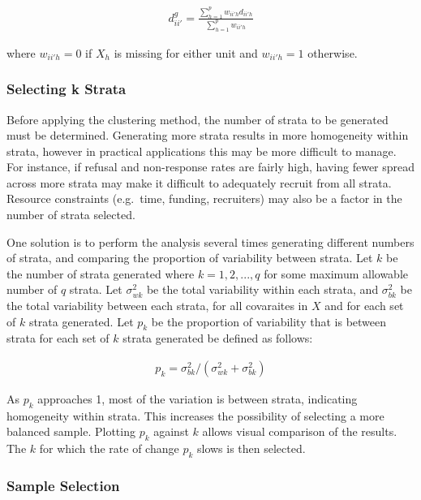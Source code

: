 \documentclass[man]{apa6}
\begin{document}
\begin{align}
  d^{g}_{ii'} = \frac{\sum^p_{h = 1}w_{ii'h}d_{ii'h}}{\sum^p_{h = 1}w_{ii'h}}
\end{align}

where \(w_{ii'h} = 0\) if \(X_h\) is missing for either unit and \(w_{ii'h} = 1\) otherwise.

\hypertarget{selecting-k-strata}{%
\subsubsection{Selecting k Strata}\label{selecting-k-strata}}

Before applying the clustering method, the number of strata to be generated must be determined. Generating more strata results in more homogeneity within strata, however in practical applications this may be more difficult to manage. For instance, if refusal and non-response rates are fairly high, having fewer spread across more strata may make it difficult to adequately recruit from all strata. Resource constraints (e.g.~time, funding, recruiters) may also be a factor in the number of strata selected.

One solution is to perform the analysis several times generating different numbers of strata, and comparing the proportion of variability between strata. Let \(k\) be the number of strata generated where \(k = 1, 2, ..., q\) for some maximum allowable number of \(q\) strata. Let \(\sigma_{wk}^2\) be the total variability within each strata, and \(\sigma_{bk}^2\) be the total variability between each strata, for all covaraites in \(X\) and for each set of \(k\) strata generated. Let \(p_k\) be the proportion of variability that is between strata for each set of \(k\) strata generated be defined as follows:

\begin{align} \label{eq:pk}
  p_k = \sigma_{bk}^2/(\sigma_{wk}^2 + \sigma_{bk}^2)
\end{align}

As \(p_k\) approaches 1, most of the variation is between strata, indicating homogeneity within strata. This increases the possibility of selecting a more balanced sample. Plotting \(p_k\) against \(k\) allows visual comparison of the results. The \(k\) for which the rate of change \(p_k\) slows is then selected.

\hypertarget{sample-selection}{%
\subsubsection{Sample Selection}\label{sample-selection}}
\end{document}
